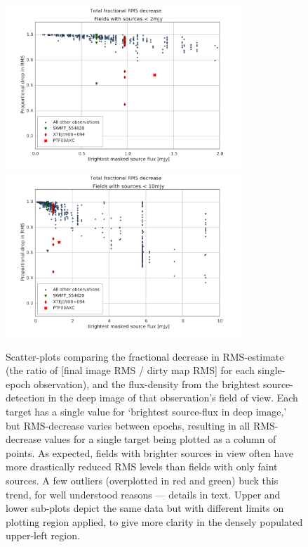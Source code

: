 \documentclass[5p,authoryear]{elsarticle}
\begin{document}
\begin{figure}[p]
\begin{center}  
  \includegraphics[width=0.8\textwidth]{../figures/rms_to_2mjy}
  \includegraphics[width=0.8\textwidth]{../figures/rms_to_10mjy}
  \caption[Fractional RMS decrease vs. brightest source flux]{%
  \label{fig:rms}
  Scatter-plots comparing the fractional decrease in RMS-estimate (the ratio of [final image RMS / dirty map RMS] for each single-epoch observation), and the flux-density from the brightest source-detection in the deep image of that observation's field of view. 
  Each target has a single value for `brightest source-flux in deep image,' but RMS-decrease varies between epochs, resulting in all RMS-decrease values for a single target being plotted as a column of points.
  As expected, fields with brighter sources in view often have more drastically reduced RMS levels than fields with only faint sources.
  A few outliers (overplotted in red and green) buck this trend, for well understood reasons --- details in text.
  Upper and lower sub-plots depict the same data but with different limits on plotting region applied, to give more clarity in the densely populated upper-left region.
} 
\end{center} 
\end{figure}
\end{document}
